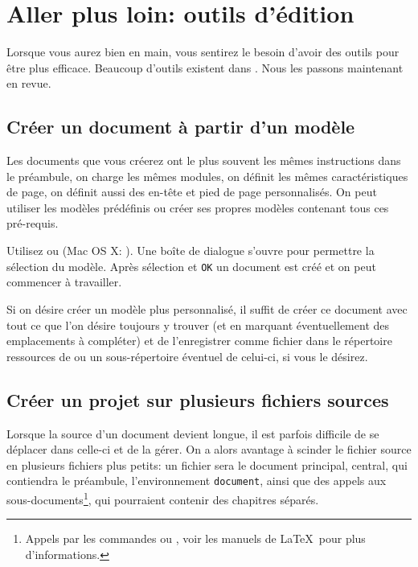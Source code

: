 
\chapter{Aller plus loin: outils d'{\'e}dition}

Lorsque vous aurez \Tw{} bien en main, vous sentirez le besoin d'avoir des outils pour être plus efficace. Beaucoup d'outils existent dans \Tw{}. Nous les passons maintenant en revue.

\section{Créer un document à partir d'un modèle}

Les documents que vous créerez ont le plus souvent les mêmes instructions dans le préambule, on charge les mêmes modules, on définit les mêmes caractéristiques de page, on définit aussi des en-tête et pied de page personnalisés. On peut utiliser les modèles prédéfinis ou créer ses propres modèles contenant tous ces pré-requis.

Utilisez \submenu{} ou  (Mac OS X: ). Une boîte de dialogue s'ouvre pour permettre la sélection du modèle. Après sélection et \verb|OK| un document est créé et on peut commencer à travailler.

Si on désire créer un modèle plus personnalisé, il suffit de créer ce document avec tout ce que l'on désire toujours y trouver (et en marquant éventuellement des emplacements à compléter) et de l'enregistrer comme fichier  dans le répertoire ressources de \Tw{}  ou un sous-répertoire éventuel de celui-ci, si vous le désirez.

\section{Créer un projet sur plusieurs fichiers sources}

Lorsque la source d'un document devient longue, il est parfois difficile de se déplacer dans celle-ci et de la gérer. On a alors avantage à scinder le fichier source en plusieurs fichiers plus petits: un fichier sera le document principal, central, qui contiendra le préambule, l'environnement \verb|document|, ainsi que des appels aux \og sous-documents\fg \footnote{Appels par les commandes \verb|| ou \verb||, voir les manuels de \LaTeX\ pour plus d'informations.}, qui pourraient contenir des chapitres séparés.

